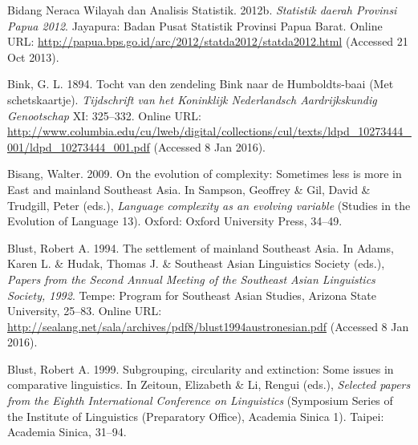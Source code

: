 \begin{styleCitaviBibliographyEntry}
Bidang Neraca Wilayah dan Analisis Statistik. 2012b. \textit{Statistik daerah Provinsi Papua 2012}. Jayapura: Badan Pusat Statistik Provinsi Papua Barat. Online URL: \url{http://papua.bps.go.id/arc/2012/statda2012/statda2012.html} (Accessed 21 Oct 2013).
\end{styleCitaviBibliographyEntry}

\begin{styleCitaviBibliographyEntry}
Bink, G. L. 1894. Tocht van den zendeling Bink naar de Humboldts-baai (Met schetskaartje). \textit{Tijdschrift van het Koninklijk Nederlandsch Aardrijkskundig Genootschap} XI: 325–332. Online URL: \url{http://www.columbia.edu/cu/lweb/digital/collections/cul/texts/ldpd_10273444_001/ldpd_10273444_001.pdf} (Accessed 8 Jan 2016).
\end{styleCitaviBibliographyEntry}

\begin{styleCitaviBibliographyEntry}
Bisang, Walter. 2009. On the evolution of complexity: Sometimes less is more in East and mainland Southeast Asia. In Sampson, Geoffrey \& Gil, David \& Trudgill, Peter (eds.), \textit{Language complexity as an evolving variable} (Studies in the Evolution of Language 13). Oxford: Oxford University Press, 34–49.
\end{styleCitaviBibliographyEntry}

\begin{styleCitaviBibliographyEntry}
Blust, Robert A. 1994. The  settlement of mainland Southeast Asia. In Adams, Karen L. \& Hudak, Thomas J. \& Southeast Asian Linguistics Society (eds.), \textit{Papers from the Second Annual Meeting of the Southeast Asian Linguistics Society, 1992}. Tempe: Program for Southeast Asian Studies, Arizona State University, 25–83. Online URL: \url{http://sealang.net/sala/archives/pdf8/blust1994austronesian.pdf} (Accessed 8 Jan 2016).
\end{styleCitaviBibliographyEntry}

\begin{styleCitaviBibliographyEntry}
Blust, Robert A. 1999. Subgrouping, circularity and extinction: Some issues in  comparative linguistics. In Zeitoun, Elizabeth \& Li, Rengui (eds.), \textit{Selected papers from the Eighth International Conference on  Linguistics} (Symposium Series of the Institute of Linguistics (Preparatory Office), Academia Sinica 1). Taipei: Academia Sinica, 31–94.
\end{styleCitaviBibliographyEntry}

